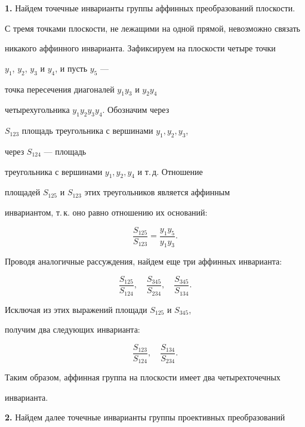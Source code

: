 \medskip





{\bf 1.} Найдем точечные инварианты группы аффинных преобразований плоскости.


С тремя точками плоскости, не лежащими на одной прямой, невозможно связать


никакого аффинного инварианта. Зафиксируем на плоскости четыре точки


$y_{1}$, $y_{2}$, $y_{3}$ и $y_{4}$, и пусть $y_{5}$ ---


точка пересечения диагоналей  $y_{1}y_{3}$ и $y_{2}y_{4}$


четырехугольника $y_{1}y_{2}y_{3}y_{4}$. Обозначим через


$S_{123}$ площадь треугольника с вершинами $y_{1}, y_{2}, y_{3}$,


через $S_{124}$ --- площадь


треугольника с вершинами $y_{1}, y_{2}, y_{4}$ и т.\,д. Отношение


площадей $S_{125}$ и $S_{123}$ этих треугольников является аффинным


инвариантом, т.\,к. оно равно отношению их оснований:


$$


\frac{S_{125}}{S_{123}}=\frac{y_{1}y_{5}}{y_{1}y_{3}}.


$$


Проводя аналогичные рассуждения, найдем еще три аффинных инварианта:


$$


\frac{S_{125}}{S_{124}}, \quad 


\frac{S_{345}}{S_{234}}, \quad 


\frac{S_{345}}{S_{134}}.


$$


Исключая из этих выражений площади $S_{125}$ и $S_{345}$, 


получим два следующих инварианта:


$$


\frac{S_{123}}{S_{124}}, \quad \frac{S_{134}}{S_{234}}.


$$


Таким образом, аффинная группа на плоскости имеет два четырехточечных


инварианта.


\medskip





{\bf 2.} Найдем далее точечные инварианты группы проективных преобразований


